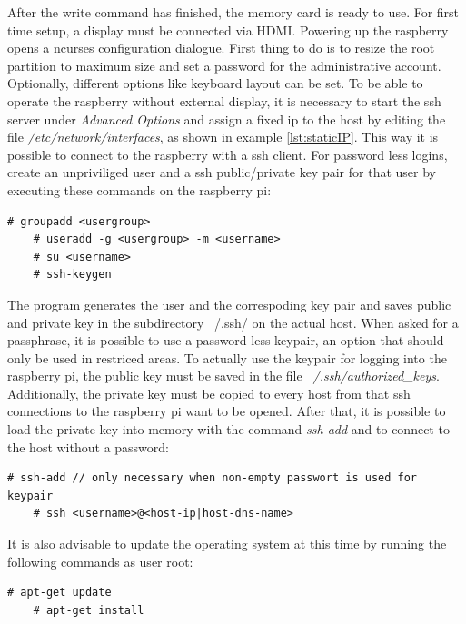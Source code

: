 After the write command has finished, the memory card is ready to use. For first time setup, a display must be connected via HDMI. Powering up the raspberry
opens a ncurses configuration dialogue. First thing to do is to resize the root partition to maximum size and set a password for the administrative
account. Optionally, different options like keyboard layout can be set.
To be able to operate the raspberry without external display, it is necessary to start the \gls{ssh} server under \textit{Advanced Options} and assign a 
fixed ip to the host by editing the file \textit{/etc/network/interfaces}, as shown in example \ref{lst:staticIP}. This way it is possible to connect to the
raspberry with a \gls{ssh} client. For password less logins, create an unpriviliged user and
 a \gls{ssh} public/private key pair for that user by executing these commands on the raspberry pi:

\begin{lstlisting}[style=BashInputStyle]
    # groupadd <usergroup>
    # useradd -g <usergroup> -m <username>
    # su <username>
    # ssh-keygen
\end{lstlisting}
 
The program generates the user and the correspoding key pair and saves public and private key in the subdirectory ~/.ssh/ on the actual host. When asked for a passphrase, it is possible
to use a password-less keypair, an option that should only be used in restriced areas.
To actually use the keypair for logging into
the raspberry pi, the public key must be saved in the file \textit{~/.ssh/authorized\_keys}. Additionally, the private key must be copied to every host
from that \gls{ssh} connections to the raspberry pi want to be opened. After that, it is possible to load the private key into memory with the command \textit{ssh-add}
and to connect to the host without a password:

\begin{lstlisting}[style=BashInputStyle]
    # ssh-add // only necessary when non-empty passwort is used for keypair
    # ssh <username>@<host-ip|host-dns-name>
\end{lstlisting}

It is also advisable to update the operating system at this time by running the following commands as user root:

\begin{lstlisting}[style=BashInputStyle]
    # apt-get update
    # apt-get install
\end{lstlisting}

